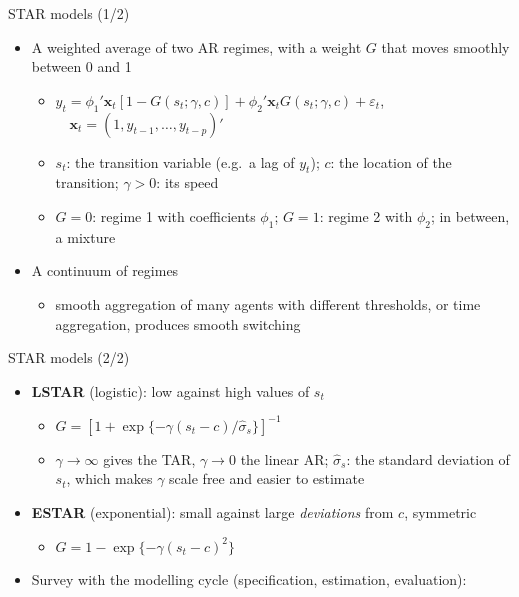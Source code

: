 \begin{frame}{STAR models (1/2)}
\itemsize{\small}
\begin{itemize}
    \item A weighted average of two AR regimes, with a weight $G$ that moves smoothly between 0 and 1 
    \begin{itemize}
        \item $y_t = \phi_1'\mathbf x_t[1 - G(s_t; \gamma, c)] + \phi_2'\mathbf x_t G(s_t; \gamma, c) + \varepsilon_t$, $\quad \mathbf x_t = (1, y_{t-1}, \dots, y_{t-p})'$
        \item $s_t$: the transition variable (e.g.\ a lag of $y_t$); $c$: the location of the transition; $\gamma > 0$: its speed
        \item $G = 0$: regime 1 with coefficients $\phi_1$; $G = 1$: regime 2 with $\phi_2$; in between, a mixture
    \end{itemize}
    \item A continuum of regimes
    \begin{itemize}
        \item smooth aggregation of many agents with different thresholds, or time aggregation, produces smooth switching
    \end{itemize}
\end{itemize}
\end{frame}

\begin{frame}{STAR models (2/2)}
\itemsize{\small}
\begin{itemize}
    \item \textbf{LSTAR} (logistic): low against high values of $s_t$
    \begin{itemize}
        \item $G = [1 + \exp\{-\gamma(s_t - c)/\hat\sigma_s\}]^{-1}$
        \item $\gamma \to \infty$ gives the TAR, $\gamma \to 0$ the linear AR; $\hat\sigma_s$: the standard deviation of $s_t$, which makes $\gamma$ scale free and easier to estimate
    \end{itemize}
    \item \textbf{ESTAR} (exponential): small against large \emph{deviations} from $c$, symmetric
    \begin{itemize}
        \item $G = 1 - \exp\{-\gamma(s_t - c)^2\}$
    \end{itemize}
    \item Survey with the modelling cycle (specification, estimation, evaluation): 
\end{itemize}
\end{frame}

